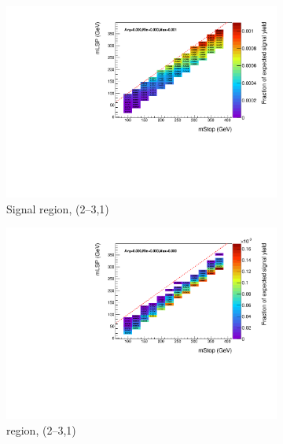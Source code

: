 \begin{figure}[ht!]
\begin{subfigure}[b]{0.47\textwidth}
    \includegraphics[width=\textwidth]{Figs/sms/t2degen/v23/effs/T2_4body_had_eff_maps_eq1b_le3j_SITV.pdf}
    \caption{Signal region, (2--3,1)}
    \label{fig:t2_4body_sig_eff_le3j_1b}
  \end{subfigure}
  \begin{subfigure}[b]{0.47\textwidth}
    \includegraphics[width=\textwidth]{Figs/sms/t2degen/v23/effs/T2_4body_muon_eff_maps_eq1b_le3j_SITV.pdf}
    \caption{\mj region, (2--3,1)}
    \label{fig:t2_4body_mu_eff_le3j_1b}
  \end{subfigure} \\
  \begin{subfigure}[b]{0.47\textwidth}

\end{subfigure}
\end{figure}
